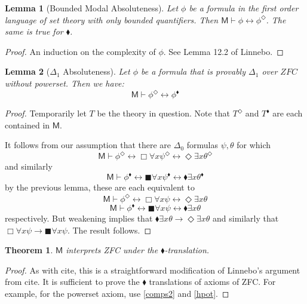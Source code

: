 \documentclass{article}
\newcommand\D{\blacklozenge}
\newcommand\B{\blacksquare}
\newtheorem{lemma}{Lemma}
\newtheorem{theorem}{Theorem}
\begin{document}
\begin{lemma}[Bounded Modal Absoluteness]\label{BMA}
    Let $\phi$ be 
    a formula in the first order language of set theory
    with only bounded quantifiers. Then
    $\mathsf{M} \vdash \phi \leftrightarrow \phi^\Diamond$.
    The same is true for $\blacklozenge$.
\end{lemma}
\begin{proof}
    An induction on the complexity of $\phi$. See Lemma 12.2 of Linnebo.
\end{proof}
\begin{lemma}[$\Delta_1$ Absoluteness]\label{DA}
    Let $\phi$ be a formula that is provably $\Delta_1$ over $ZFC$ without 
    powerset. Then we have: 
    \[\mathsf{M} \vdash \phi^{\Diamond} \leftrightarrow \phi^{\D}\]
\end{lemma}
\begin{proof}
    Temporarily let $T$ be the theory in question.
    Note that $T^\Diamond$ and $T^{\D}$ are each contained in $\mathsf{M}$.

    It follows from our assumption that there are $\Delta_0$ formulas $\psi, \theta$
    for which
    \[\mathsf{M} \vdash \phi^\Diamond \leftrightarrow 
    \Box \forall x \psi^\Diamond \leftrightarrow 
    \Diamond \exists x \theta^\Diamond \] 
    and similarly
    \[\mathsf{M} \vdash \phi^{\D} \leftrightarrow 
    \B \forall x \psi^{\D} \leftrightarrow 
    \D \exists x \theta^{\D} \] 
    by the previous lemma, these are each equivalent to 
    \[\mathsf{M} \vdash \phi^\Diamond \leftrightarrow 
    \Box \forall x \psi \leftrightarrow 
    \Diamond \exists x \theta \] 
    \[\mathsf{M} \vdash \phi^{\D} \leftrightarrow 
    \B \forall x \psi \leftrightarrow 
    \D \exists x \theta \] 
    respectively. But weakening implies that 
    $\D \exists x \theta \rightarrow \Diamond \exists x \theta$
    and similarly that $\Box \forall x \psi \rightarrow \B \forall x \psi$.
    The result follows.
\end{proof}

\begin{theorem}
    $\mathsf{M}$ interprets ZFC under the $\D$-translation.
\end{theorem}
\begin{proof}
    As with cite, this is a straightforward modification of 
    Linnebo's argument from cite. It is sufficient to prove the $\D$ 
    translations of axioms of ZFC. For example, for the powerset 
    axiom, use \eqref{comps2} and \eqref{hpot}.
\end{proof}
\end{document}
